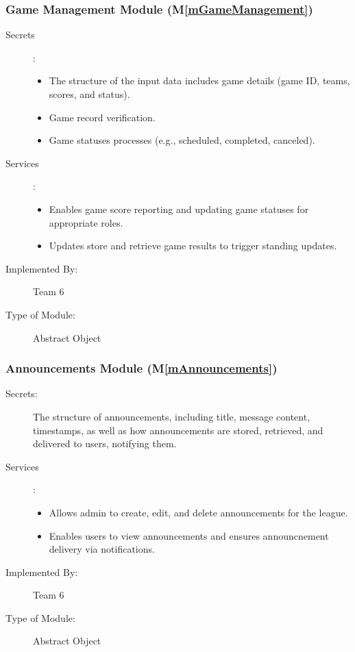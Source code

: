 \documentclass[12pt, titlepage]{article}
\newcommand{\mref}[1]{M\ref{#1}}
\begin{document}
\subsubsection{Game Management Module (\mref{mGameManagement})}

\begin{description}
  \item[Secrets] : 
  \begin{itemize}
      \item The structure of the input data includes game details (game ID, teams, scores, and status).
      \item Game record verification.
      \item Game statuses processes (e.g., scheduled, completed, canceled).
  \end{itemize}
  
\item[Services]: 
  \begin{itemize}
      \item Enables game score reporting and updating game statuses for appropriate roles.
      \item Updates store and retrieve game results to trigger standing updates.
  \end{itemize}
  \item[Implemented By:] Team 6
    
  \item[Type of Module:] Abstract Object
  \end{description}
\subsubsection{Announcements Module (\mref{mAnnouncements})}

\begin{description}
  \item[Secrets:] The structure of announcements, including title, message content, timestamps, as well as how announcements are stored, retrieved, and delivered to users, notifying them.

\item[Services]: 
  \begin{itemize}
      \item Allows admin to create, edit, and delete announcements for the league.
      \item Enables users to view announcements and ensures announcnement delivery via notifications.
  \end{itemize}

\item[Implemented By:] Team 6
    
\item[Type of Module:] Abstract Object
\end{description}
  
\end{document}

